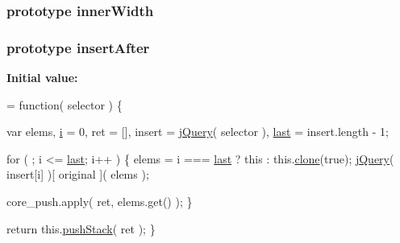 \subsubsection[{inner\+Width}]{ {\bf prototype} inner\+Width}\label{jquery-1_810_82-vsdoc_8js_a903029bceb8e6512b7e550f1ac0efbd2}
\hypertarget{jquery-1_810_82-vsdoc_8js_a6337c8bc3e44ee2285abf58492aed7f2}{}
\subsubsection[{insert\+After}]{ {\bf prototype} insert\+After}\label{jquery-1_810_82-vsdoc_8js_a6337c8bc3e44ee2285abf58492aed7f2}
{\bfseries Initial value\+:}
\begin{DoxyCode}
= \textcolor{keyword}{function}( selector ) \{


        var elems,
            \hyperlink{_bibabook_2_scripts_2respond_8min_8js_a5e25b1d1bed9ab5f3174b76d6a722180}{i} = 0,
            ret = [],
            insert = \hyperlink{jquery-1_810_82-vsdoc_8js_add5237586d970a38a81f990e8eb28c6c}{jQuery}( selector ),
            \hyperlink{jquery-1_810_82-vsdoc_8js_a5a9684d230de11a6ec3029bcce128977}{last} = insert.length - 1;

        \textcolor{keywordflow}{for} ( ; i <= \hyperlink{jquery-1_810_82-vsdoc_8js_a5a9684d230de11a6ec3029bcce128977}{last}; i++ ) \{
            elems = i === \hyperlink{jquery-1_810_82-vsdoc_8js_a5a9684d230de11a6ec3029bcce128977}{last} ? \textcolor{keyword}{this} : this.\hyperlink{jquery-1_810_82-vsdoc_8js_a7d74ce76585989b4b6e2d506577e13ad}{clone}(\textcolor{keyword}{true});
            \hyperlink{jquery-1_810_82-vsdoc_8js_add5237586d970a38a81f990e8eb28c6c}{jQuery}( insert[i] )[ original ]( elems );

            
            core\_push.apply( ret, elems.get() );
        \}

        \textcolor{keywordflow}{return} this.\hyperlink{jquery-1_810_82-vsdoc_8js_afc3a7db1ef2b526338c06c07cecccd44}{pushStack}( ret );
    \}
\end{DoxyCode}
\hypertarget{jquery-1_810_82-vsdoc_8js_a5501f909e772d4b753879c11efe9b64f}{}
